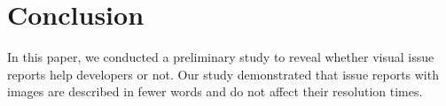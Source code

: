 \section{Conclusion}
\label{sec:conclusion}

In this paper, we conducted a preliminary study to reveal  
whether visual issue reports help developers or not. 
Our study demonstrated that issue reports with images are described in fewer words and do not affect their resolution times. 

% 
% 


